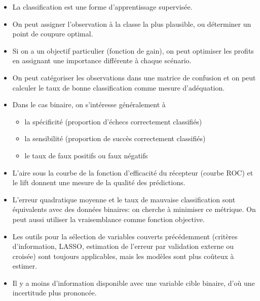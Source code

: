 \documentclass[
  11pt,
  letterpaper,
]{scrbook}
\providecommand{\tightlist}{%
  \setlength{\itemsep}{0pt}\setlength{\parskip}{0pt}}\usepackage{longtable,booktabs,array}
\theoremstyle{definition}
\theoremstyle{remark}
\begin{document}
\begin{tcolorbox}[enhanced jigsaw, bottomtitle=1mm, bottomrule=.15mm, colbacktitle=quarto-callout-note-color!10!white, left=2mm, arc=.35mm, opacityback=0, colback=white, toprule=.15mm, coltitle=black, toptitle=1mm, colframe=quarto-callout-note-color-frame, titlerule=0mm, title=\textcolor{quarto-callout-note-color}{\faInfo}\hspace{0.5em}{En résumé}, opacitybacktitle=0.6, leftrule=.75mm, breakable, rightrule=.15mm]

\begin{itemize}
\tightlist
\item
  La classification est une forme d'apprentissage supervisée.
\item
  On peut assigner l'observation à la classe la plus plausible, ou
  déterminer un point de coupure optimal.
\item
  Si on a un objectif particulier (fonction de gain), on peut optimiser
  les profits en assignant une importance différente à chaque scénario.
\item
  On peut catégoriser les observations dans une matrice de confusion et
  on peut calculer le taux de bonne classification comme mesure
  d'adéquation.
\item
  Dans le cas binaire, on s'intéresse généralement à

  \begin{itemize}
  \tightlist
  \item
    la spécificité (proportion d'échecs correctement classifiés)
  \item
    la sensibilité (proportion de succès correctement classifiés)
  \item
    le taux de faux positifs ou faux négatifs
  \end{itemize}
\item
  L'aire sous la courbe de la fonction d'efficacité du récepteur (courbe
  ROC) et le lift donnent une mesure de la qualité des prédictions.
\item
  L'erreur quadratique moyenne et le taux de mauvaise classification
  sont équivalents avec des données binaires: on cherche à minimiser ce
  métrique. On peut aussi utiliser la vraisemblance comme fonction
  objective.
\item
  Les outils pour la sélection de variables couverts précédemment
  (critères d'information, LASSO, estimation de l'erreur par validation
  externe ou croisée) sont toujours applicables, mais les modèles sont
  plus coûteux à estimer.
\item
  Il y a moins d'information disponible avec une variable cible binaire,
  d'où une incertitude plus prononcée.
\end{itemize}

\end{tcolorbox}
\end{document}
